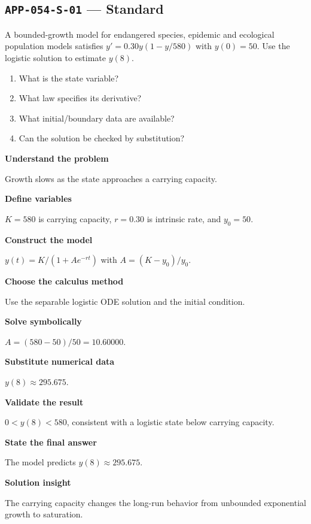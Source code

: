 \documentclass[11pt]{book}
\newcommand{\pid}[1]{\texttt{#1}}
\begin{document}
\subsection*{\pid{APP-054-S-01} — Standard}
\begin{problembox}
A bounded-growth model for endangered species, epidemic and ecological population models satisfies $y'=0.30y(1-y/580)$ with $y(0)=50$. Use the logistic solution to estimate $y(8)$.
\end{problembox}
\begin{promptbox}\begin{enumerate}
\item What is the state variable?
\item What law specifies its derivative?
\item What initial/boundary data are available?
\item Can the solution be checked by substitution?
\end{enumerate}\end{promptbox}
\begin{solutionbox}
\textbf{Understand the problem}\par Growth slows as the state approaches a carrying capacity.\par\medskip
\textbf{Define variables}\par $K=580$ is carrying capacity, $r=0.30$ is intrinsic rate, and $y_0=50$.\par\medskip
\textbf{Construct the model}\par $y(t)=K/(1+A e^{-rt})$ with $A=(K-y_0)/y_0$.\par\medskip
\textbf{Choose the calculus method}\par Use the separable logistic ODE solution and the initial condition.\par\medskip
\textbf{Solve symbolically}\par $A=(580-50)/50=10.60000$.\par\medskip
\textbf{Substitute numerical data}\par $y(8)\approx 295.675$.\par\medskip
\textbf{Validate the result}\par $0<y(8)<580$, consistent with a logistic state below carrying capacity.\par\medskip
\textbf{State the final answer}\par The model predicts $y(8)\approx 295.675$.\par\medskip
\textbf{Solution insight}\par The carrying capacity changes the long-run behavior from unbounded exponential growth to saturation.\par\medskip
\end{solutionbox}
\end{document}

